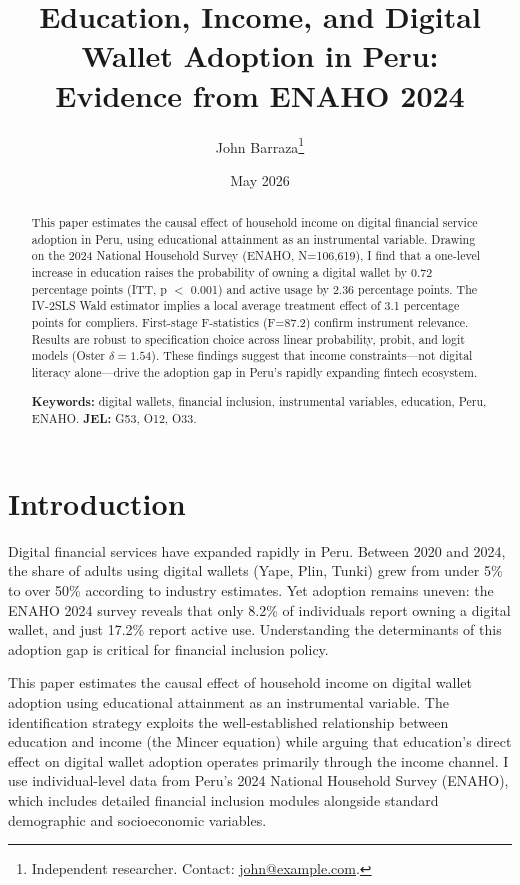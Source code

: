 \documentclass[12pt,a4paper]{article}
\title{Education, Income, and Digital Wallet Adoption in Peru:\\
Evidence from ENAHO 2024}
\author{John Barraza\thanks{Independent researcher. Contact: \href{mailto:john@example.com}{john@example.com}.}}
\date{May 2026}
\begin{document}
\maketitle

\begin{abstract}
This paper estimates the causal effect of household income on digital financial
service adoption in Peru, using educational attainment as an instrumental variable.
Drawing on the 2024 National Household Survey (ENAHO, N=106,619), I find that a
one-level increase in education raises the probability of owning a digital wallet
by 0.72 percentage points (ITT, p $<$ 0.001) and active usage by 2.36 percentage
points. The IV-2SLS Wald estimator implies a local average treatment effect of
3.1 percentage points for compliers. First-stage F-statistics (F=87.2) confirm
instrument relevance. Results are robust to specification choice across linear
probability, probit, and logit models (Oster $\delta = 1.54$). These findings
suggest that income constraints---not digital literacy alone---drive the adoption
gap in Peru's rapidly expanding fintech ecosystem.

\textbf{Keywords:} digital wallets, financial inclusion, instrumental variables,
education, Peru, ENAHO.
\textbf{JEL:} G53, O12, O33.
\end{abstract}

\section{Introduction}
\label{sec:intro}

Digital financial services have expanded rapidly in Peru. Between 2020 and 2024,
the share of adults using digital wallets (Yape, Plin, Tunki) grew from under 5\%
to over 50\% according to industry estimates. Yet adoption remains uneven: the
ENAHO 2024 survey reveals that only 8.2\% of individuals report owning a digital
wallet, and just 17.2\% report active use. Understanding the determinants of
this adoption gap is critical for financial inclusion policy.

This paper estimates the causal effect of household income on digital wallet
adoption using educational attainment as an instrumental variable. The
identification strategy exploits the well-established relationship between
education and income (the Mincer equation) while arguing that education's direct
effect on digital wallet adoption operates primarily through the income channel.
I use individual-level data from Peru's 2024 National Household Survey (ENAHO),
which includes detailed financial inclusion modules alongside standard
demographic and socioeconomic variables.
\end{document}

